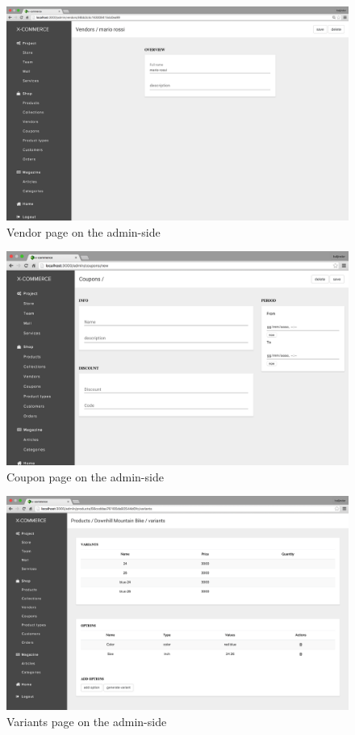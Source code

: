 \begin{figure}[htb]
\centering
\includegraphics[width=1.0\linewidth]{images/chapter4/page-vendor-all.png}\hfill
\caption[Vendor page on the  admin-side]{Vendor page on the admin-side}
\label{fig:page_vendor_admin}
\end{figure}
\begin{figure}[htb]
\centering
\includegraphics[width=1.0\linewidth]{images/chapter4/page-coupon-all.png}\hfill
\caption[Coupon page on the admin-side]{Coupon page on the admin-side}
\label{fig:page_coupon_admin}
\end{figure}
\newpage
\begin{figure}[htb]
\centering
\includegraphics[width=1.0\linewidth]{images/chapter4/page-variants.png}\hfill
\caption[Variants page on the admin-side]{Variants page on the admin-side}
\label{fig:page_variants_admin}
\end{figure}
\newpage